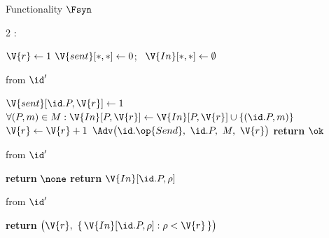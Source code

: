 \begin{interface}[nofloat]{Functionality $\Fsyn$ \\
\params{$\PID$, \quad $\Ps$, \quad $\admits$, \quad
$\uses := \{(\Adv,\serves)\}$, \quad $\pars := \none$}}

{\scriptsize
\setlength{\columnsep}{1.4em}
\begin{multicols}{2}
:
\begin{algorithmic}[1]
\setcounter{contline}{0}\algcont
\State $\V{r} \gets 1$
\State $\V{sent}[*,*] \gets 0$; \ $\V{In}[*,*] \gets \emptyset$
\algsave
\end{algorithmic}
\vspace{1.4ex}

 \quad from $\id'$
\begin{algorithmic}[1]
\algcont
{} \label{ln:synonce}
\State $\V{sent}[\id.P, \V{r}] \gets 1$
\State $\forall (P, m) \in M : \V{In}[P, \V{r}] \gets \V{In}[P, \V{r}] \cup \{(\id.P, m)\}$ \label{ln:syndeliver}
  \State $\V{r} \gets \V{r} + 1$ \label{ln:synadvance}
\EndIf
\State $\Adv\bigl(\id.\op{Send},\ \id.P,\ M,\ \V{r}\bigr)$ \label{ln:synrush}
\State \textbf{return} $\ok$
\algsave
\end{algorithmic}
\vspace{1.4ex}

\columnbreak

 \quad from $\id'$
\begin{algorithmic}[1]
\algcont
{}
  \State \textbf{return} $\none$ \label{ln:synincomplete}
\EndIf
\State \textbf{return} $\V{In}[\id.P, \rho]$ \label{ln:synread}
\algsave
\end{algorithmic}
\vspace{1.4ex}

 \quad from $\id'$
\begin{algorithmic}[1]
\algcont
\State \textbf{return} $\bigl(\V{r},\ \{\, \V{In}[\id.P, \rho] : \rho < \V{r} \,\}\bigr)$ \label{ln:synleak}
\algsave
\end{algorithmic}
\end{multicols}}
\end{interface}
